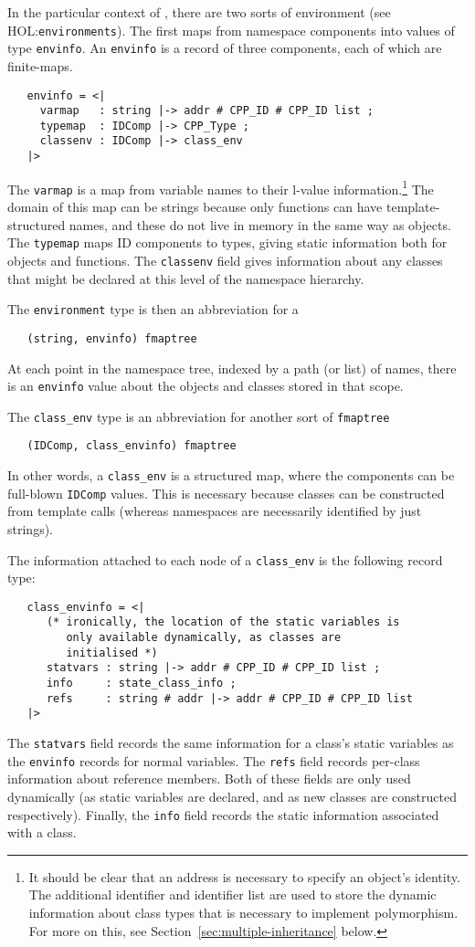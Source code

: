 \documentclass[11pt]{article}
\newcommand{\HOLfile}[1]{HOL:\texttt{#1}}
\begin{document}
In the particular context of \cpp{}, there are two sorts of
environment (see \HOLfile{environments}).  The first maps from
namespace components into values of type \texttt{envinfo}.  An
\texttt{envinfo} is a record of three components, each of which are
finite-maps.
\begin{verbatim}
   envinfo = <|
     varmap   : string |-> addr # CPP_ID # CPP_ID list ;
     typemap  : IDComp |-> CPP_Type ;
     classenv : IDComp |-> class_env
   |>
\end{verbatim}
The \texttt{varmap} is a map from variable names to their l-value
information.\footnote{It should be clear that an address is necessary
  to specify an object's identity.  The additional identifier and
  identifier list are used to store the dynamic information about
  class types that is necessary to implement polymorphism.  For more
  on this, see Section~\ref{sec:multiple-inheritance} below.}  The
domain of this map can be strings because only functions can have
template-structured names, and these do not live in memory in the same
way as objects.  The \texttt{typemap} maps ID components to types,
giving static information both for objects and functions.  The
\texttt{classenv} field gives information about any classes that might
be declared at this level of the namespace hierarchy.

The \texttt{environment} type is then an abbreviation for a
\begin{verbatim}
   (string, envinfo) fmaptree
\end{verbatim}
At each point in the namespace tree, indexed by a path (or list) of
names, there is an \texttt{envinfo} value about the objects and
classes stored in that scope.

The \texttt{class_env} type is an abbreviation for another sort of
\texttt{fmaptree}
\begin{verbatim}
   (IDComp, class_envinfo) fmaptree
\end{verbatim}
In other words, a \texttt{class_env} is a structured map, where the
components can be full-blown \texttt{IDComp} values.  This is
necessary because classes can be constructed from template calls
(whereas namespaces are necessarily identified by just strings).

The information attached to each node of a \texttt{class_env} is the
following record type:
\begin{verbatim}
   class_envinfo = <|
      (* ironically, the location of the static variables is
         only available dynamically, as classes are
         initialised *)
      statvars : string |-> addr # CPP_ID # CPP_ID list ;
      info     : state_class_info ;
      refs     : string # addr |-> addr # CPP_ID # CPP_ID list
   |>
\end{verbatim}
The \texttt{statvars} field records the same information for a class's
static variables as the \texttt{envinfo} records for normal
variables.  The \texttt{refs} field records per-class information
about reference members.  Both of these fields are only used
dynamically (as static variables are declared, and as new classes are
constructed respectively).  Finally, the \texttt{info} field records
the static information associated with a class.
\end{document}
